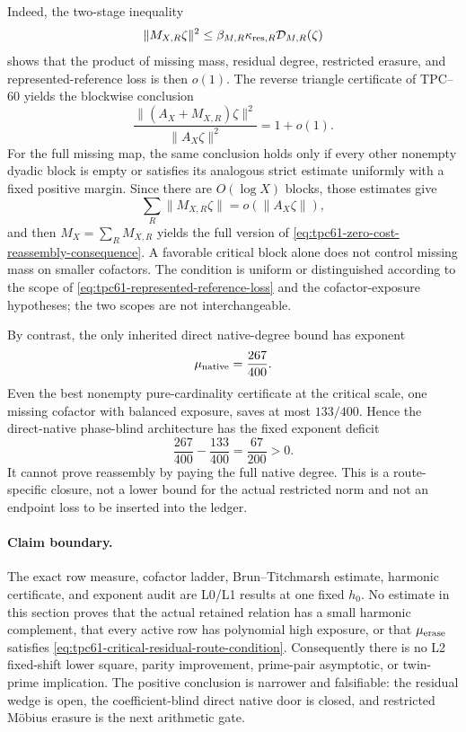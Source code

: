 Indeed, the two-stage inequality
\begin{equation}
 \|M_{X,R}\zeta\|^2
 \le\beta_{M,R}\kappa_{{\rm res},R}
       \mathcal D_{M,R}(\zeta)
 \label{eq:tpc61-block-two-stage-upper}
\end{equation}
shows that the product of missing mass, residual degree, restricted
erasure, and represented-reference loss is then \(o(1)\).  The reverse
triangle certificate of TPC--60 yields the blockwise conclusion
\begin{equation}
 \frac{\|(A_X+M_{X,R})\zeta\|^2}{\|A_X\zeta\|^2}=1+o(1).
 \label{eq:tpc61-zero-cost-reassembly-consequence}
\end{equation}
For the full missing map, the same conclusion holds only if every other
nonempty dyadic block is empty or satisfies its analogous strict estimate
uniformly with a fixed positive margin.  Since there are \(O(\log X)\)
blocks, those estimates give
\begin{equation}
 \sum_R\|M_{X,R}\zeta\|=o(\|A_X\zeta\|),
 \label{eq:tpc61-all-blocks-small}
\end{equation}
and then \(M_X=\sum_RM_{X,R}\) yields the full version of
\eqref{eq:tpc61-zero-cost-reassembly-consequence}.  A favorable critical
block alone does not control missing mass on smaller cofactors.
The condition is uniform or distinguished according to the scope of
\eqref{eq:tpc61-represented-reference-loss} and the cofactor-exposure
hypotheses; the two scopes are not interchangeable.

By contrast, the only inherited direct native-degree bound has exponent
\begin{equation}
 \mu_{\rm native}=\frac{267}{400}.
 \label{eq:tpc61-crude-native-exponent}
\end{equation}
Even the best nonempty pure-cardinality certificate at the critical scale,
one missing cofactor with balanced exposure, saves at most \(133/400\).
Hence the direct-native phase-blind architecture has the fixed exponent
deficit
\begin{equation}
 \boxed{
 \frac{267}{400}-\frac{133}{400}
 =\frac{67}{200}>0.}
 \label{eq:tpc61-direct-native-deficit}
\end{equation}
It cannot prove reassembly by paying the full native degree.  This is a
route-specific closure, not a lower bound for the actual restricted norm
and not an endpoint loss to be inserted into the ledger.

\paragraph{Claim boundary.}
The exact row measure, cofactor ladder, Brun--Titchmarsh estimate, harmonic
certificate, and exponent audit are L0/L1 results at one fixed \(h_0\).
No estimate in this section proves that the actual retained relation has a
small harmonic complement, that every active row has polynomial high
exposure, or that \(\mu_{\rm erase}\) satisfies
\eqref{eq:tpc61-critical-residual-route-condition}.  Consequently there is
no L2 fixed-shift lower square, parity improvement, prime-pair asymptotic,
or twin-prime implication.  The positive conclusion is narrower and
falsifiable: the residual wedge is open, the coefficient-blind direct
native door is closed, and restricted M\"obius erasure is the next
arithmetic gate.
